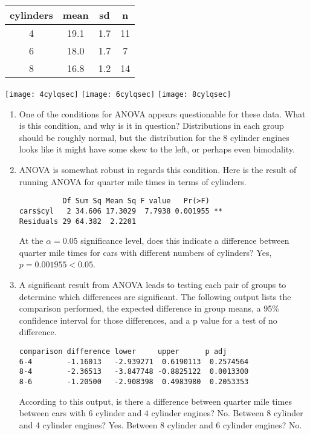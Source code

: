 \documentclass[12pt,fullpage]{amsart}
\begin{document}
\begin{enumerate}
\begin{tabular}{c|ccc}
cylinders& mean & sd & n\\
\hline
4 & 19.1 & 1.7 & 11\\
6 & 18.0 & 1.7 & 7\\
8 & 16.8 & 1.2 & 14
\end{tabular}

\begin{center}
\texttt{[image: 4cylqsec]}\quad
\texttt{[image: 6cylqsec]}\quad
\texttt{[image: 8cylqsec]}
\end{center}

  \begin{enumerate}
  \item One of the conditions for ANOVA appears questionable for these data. What is this condition, and why is it in question?
    {\color{red} Distributions in each group should be roughly normal, but the distribution for the 8 cylinder engines looks like it might have some skew to the left, or perhaps even bimodality.}
  \item ANOVA is somewhat robust in regards this condition. Here is the result of running ANOVA for quarter mile times in terms of cylinders.
\begin{verbatim}
          Df Sum Sq Mean Sq F value   Pr(>F)   
cars$cyl   2 34.606 17.3029  7.7938 0.001955 **
Residuals 29 64.382  2.2201    
\end{verbatim}
At the $\alpha=0.05$ significance level, does this indicate a difference between quarter mile times for cars with different numbers of cylinders?
{\color{red} Yes, $p=0.001955<0.05$.} 
\item A significant result from ANOVA leads to testing each pair of groups to determine which differences are significant. The following output lists the comparison performed, the expected difference in group means, a 95\% confidence interval for those differences, and a p value for a test of no difference.
\begin{verbatim}
comparison difference lower     upper      p adj
6-4        -1.16013   -2.939271  0.6190113  0.2574564
8-4        -2.36513   -3.847748 -0.8825122  0.0013300
8-6        -1.20500   -2.908398  0.4983980  0.2053353
\end{verbatim}
According to this output, is there a difference between quarter mile times between cars with 6 cylinder and 4 cylinder engines? {\color{red} No.} Between 8 cylinder and 4 cylinder engines? {\color{red} Yes.} Between 8 cylinder and 6 cylinder engines? {\color{red} No.}
  \end{enumerate}


\end{enumerate}
\end{document}
